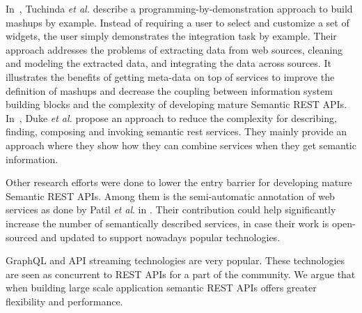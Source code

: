 In~\cite{Tuchinda:2011:BMD:1993053.1993058}, Tuchinda \textit{et al.} describe a programming-by-demonstration approach to build mashups by example. Instead of requiring a user to select and customize a set of widgets, the user simply demonstrates the integration task by example. Their approach addresses the problems of extracting data from web sources, cleaning and modeling the extracted data, and integrating the data across sources. It illustrates the benefits of getting meta-data on top of services to improve the definition of mashups and decrease the coupling between information system building blocks and the complexity of  developing mature Semantic REST APIs. In~\cite{10.1007/978-3-642-17694-4_11}, Duke \textit{et al.} propose an approach to reduce the complexity for describing, finding, composing and invoking semantic rest services. They mainly provide an approach where they show how they can combine services when they get semantic information. 

Other research efforts were done to lower the entry barrier for developing mature Semantic REST APIs. Among them is the semi-automatic annotation of web services as done by Patil \textit{et al}. in \cite{patil2004meteor}. Their contribution could help significantly increase the number of semantically described services, in case their work is open-sourced and updated to support nowadays popular technologies.

GraphQL and API streaming technologies are very popular. 
These technologies are seen as concurrent to REST APIs for a part of the community. 
We argue that when building large scale application semantic REST APIs offers greater flexibility and performance.

